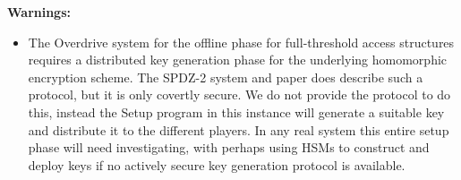 \vspace{5mm}

\noindent
{\bf Warnings:}
\begin{itemize}
\item
The Overdrive system \cite{KPR} for the offline phase
for full-threshold access structures requires a distributed key 
generation phase for the underlying homomorphic encryption scheme. 
The SPDZ-2 system and paper does describe such a protocol, but it is only
covertly secure. 
We do not provide the protocol to do this, instead the
Setup program in this instance will generate a suitable
key and distribute it to the different players.
In any real system this entire setup phase will need
investigating, with perhaps using HSMs to construct and deploy
keys if no actively secure key generation protocol is available.
\end{itemize}


